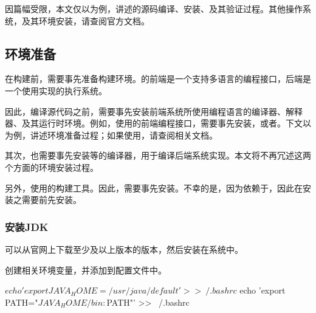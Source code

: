 \begin{content}

因篇幅受限，本文仅以为例，讲述\tf{}的源码编译、安装、及其验证过程。其他操作系统，及其环境安装，请查阅\tf{}官方文档。

\subsection{环境准备}

在构建前，需要事先准备构建环境。的前端是一个支持多语言的编程接口，后端是一个使用实现的执行系统。

因此，编译源代码之前，需要事先安装前端系统所使用编程语言的编译器、解释器、及其运行时环境。例如，使用的前端编程接口，需要事先安装，或者。下文以为例，讲述环境准备过程；如果使用，请查阅相关文档。

其次，也需要事先安装等的编译器，用于编译后端系统实现。本文将不再冗述这两个方面的环境安装过程。

另外，使用的构建工具。因此，需要事先安装。不幸的是，因为依赖于，因此在安装之需要前先安装。

\subsubsection{安装JDK}

可以从官网上下载至少及以上版本的版本，然后安装在系统中。

\begin{leftbar}
\end{leftbar}

创建相关环境变量，并添加到配置文件中。

\begin{leftbar}
\begin{python}
$ echo 'export JAVA_HOME=/usr/java/default' >> ~/.bashrc
$ echo 'export PATH="$JAVA_HOME/bin:$PATH"' >> ~/.bashrc
\end{python}
\end{leftbar}


\end{content}
